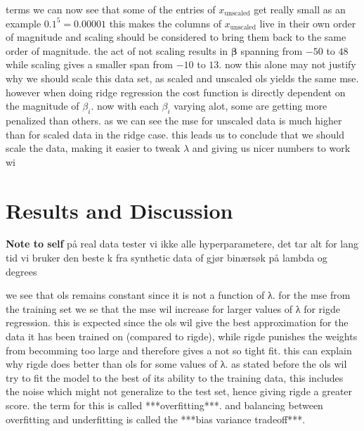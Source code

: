 \documentclass[twoside,11pt]{report}
\begin{document}
terms we can now see that some of the entries of $x_{\text{unscaled}}$ get really small 
as an example $0.1^5 = 0.00001$ this makes the columns of $x_{\text{unscaled}}$ live in 
their own order of magnitude and scaling should be considered to bring them back to the 
same order of magnitude. the act of not scaling results in $\mathbf{\beta}$ spanning 
from $-50$ to $48$ while scaling gives a smaller span from $-10$ to $13$. now this alone 
may not justify why we should scale this data set, as scaled and unscaled ols yields the 
same mse. however when doing ridge regression the cost function is directly dependent on 
the magnitude of $\beta_i$. now with each $\beta_i$ varying alot, some are getting more 
penalized than others. as we can see the mse for unscaled data is much higher than for 
scaled data in the ridge case.
this leads us to conclude that we should scale the data, making it easier to 
tweak $\lambda$ and giving us nicer numbers to work wi













\section{Results and Discussion}
\label{sec:resultsdiscussion}


\textbf{Note to self} på real data tester vi ikke alle hyperparametere, det tar alt for lang tid
vi bruker den beste k fra synthetic data of gjør binærsøk på lambda og degrees 


we see that ols remains constant since it is not a function of λ. for the mse from the training set we se that 
the mse wil increase for larger values of λ for rigde regression. this is expected since the ols wil give the 
best approximation for the data it has been trained on (compared to rigde), while rigde punishes the weights 
from becomming too large and therefore gives a not so tight fit. this can explain why rigde does better than 
ols for some values of λ. as stated before the ols wil try to fit the model to the best of its ability to the 
training data, this includes the noise which might not generalize to the test set, hence giving rigde a greater score. 
the term for this is called ***overfitting***. and balancing between overfitting and underfitting is called the ***bias variance tradeoff***. 
\end{document}
